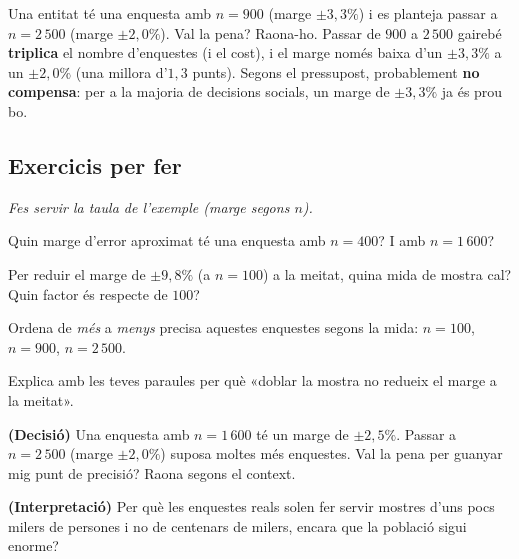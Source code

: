 \begin{exresolt}
Una entitat té una enquesta amb $n=900$ (marge $\pm 3,3\%$) i es planteja passar a
$n=2\,500$ (marge $\pm 2,0\%$). Val la pena? Raona-ho.
\solucio
Passar de $900$ a $2\,500$ gairebé \textbf{triplica} el nombre d'enquestes (i el cost), i el
marge només baixa d'un $\pm 3,3\%$ a un $\pm 2,0\%$ (una millora d'$1,3$ punts). Segons el
pressupost, probablement \textbf{no compensa}: per a la majoria de decisions socials, un
marge de $\pm 3,3\%$ ja és prou bo.
\end{exresolt}

\subsection{Exercicis per fer}

\noindent\textit{Fes servir la taula de l'exemple (marge segons $n$).}

\begin{exercicis}
\begin{exlist}
  \item Quin marge d'error aproximat té una enquesta amb $n=400$? I amb $n=1\,600$?
  \item Per reduir el marge de $\pm 9,8\%$ (a $n=100$) a la meitat, quina mida de mostra
        cal? Quin factor és respecte de $100$?
  \item Ordena de \emph{més} a \emph{menys} precisa aquestes enquestes segons la mida:
        $n=100$, $n=900$, $n=2\,500$.
  \item Explica amb les teves paraules per què «doblar la mostra no redueix el marge a la
        meitat».
  \item \textbf{(Decisió)} Una enquesta amb $n=1\,600$ té un marge de $\pm 2,5\%$. Passar a
        $n=2\,500$ (marge $\pm 2,0\%$) suposa moltes més enquestes. Val la pena per guanyar
        mig punt de precisió? Raona segons el context.
  \item \textbf{(Interpretació)} Per què les enquestes reals solen fer servir mostres d'uns
        pocs milers de persones i no de centenars de milers, encara que la població sigui
        enorme?
\end{exlist}
\end{exercicis}

